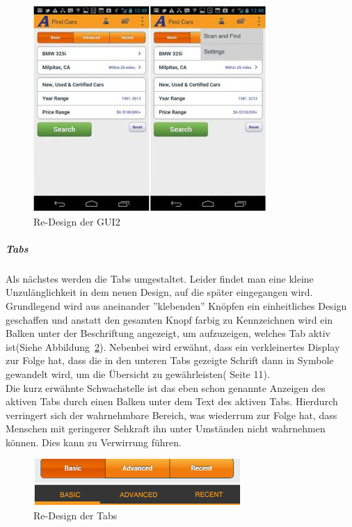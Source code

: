 \begin{figure}[!h]
 \centering
 \includegraphics[height=0.40\textheight]{img/Design4.png}
 \caption{Re-Design der GUI2}
 \label{fig:design4}
\end{figure}

\subparagraph{Tabs}
\label{sub:tabs}

Als nächstes werden die Tabs umgestaltet. Leider findet man eine kleine Unzulänglichkeit in dem neuen Design, auf die später eingegangen wird. Grundlegend wird aus aneinander ''klebenden'' Knöpfen ein einheitliches Design geschaffen und anstatt den gesamten Knopf farbig zu Kennzeichnen wird ein Balken unter der Beschriftung angezeigt, um aufzuzeigen, welches Tab aktiv ist(Siehe Abbildung~\ref{fig:tabs}). Nebenbei wird erwähnt, dass ein verkleinertes Display zur Folge hat, dass die in den unteren Tabs gezeigte Schrift dann in Symbole gewandelt wird, um die Übersicht zu gewährleisten(\cite{AndroidDesignPatterns} Seite 11).\\

Die kurz erwähnte Schwachstelle ist das eben schon genannte Anzeigen des aktiven Tabs durch einen Balken unter dem Text des aktiven Tabs. Hierdurch verringert sich der wahrnehmbare Bereich, was wiederrum zur Folge hat, dass Menschen mit geringerer Sehkraft ihn unter Umständen nicht wahrnehmen können. Dies kann zu Verwirrung führen.\\

\begin{figure}[!h]
 \centering
 \includegraphics[height=0.08\textheight]{img/tabs.png}
 \caption{Re-Design der Tabs}
 \label{fig:tabs}
\end{figure}

